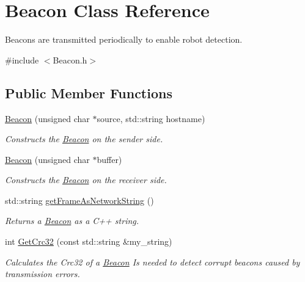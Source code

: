 \hypertarget{classBeacon}{\section{Beacon Class Reference}
\label{classBeacon}
}


Beacons are transmitted periodically to enable robot detection.  




{\ttfamily \#include $<$Beacon.\-h$>$}

\subsection*{Public Member Functions}
\begin{DoxyCompactItemize}
\item 
\hyperlink{classBeacon_aaffc4541f12325619271033678112f9f}{Beacon} (unsigned char $\ast$source, std\-::string hostname)
\begin{DoxyCompactList}\small\item\em Constructs the \hyperlink{classBeacon}{Beacon} on the sender side. \end{DoxyCompactList}\item 
\hyperlink{classBeacon_a2c2bd4621a255efdf2f60076b00cd683}{Beacon} (unsigned char $\ast$buffer)
\begin{DoxyCompactList}\small\item\em Constructs the \hyperlink{classBeacon}{Beacon} on the receiver side. \end{DoxyCompactList}\item 
std\-::string \hyperlink{classBeacon_acc9536d578591492b2a09064667d09d2}{get\-Frame\-As\-Network\-String} ()
\begin{DoxyCompactList}\small\item\em Returns a \hyperlink{classBeacon}{Beacon} as a C++ string. \end{DoxyCompactList}\item 
int \hyperlink{classBeacon_a85a0dbb4be299c38792b5b6c12f40e8b}{Get\-Crc32} (const std\-::string \&my\-\_\-string)
\begin{DoxyCompactList}\small\item\em Calculates the Crc32 of a \hyperlink{classBeacon}{Beacon} Is needed to detect corrupt beacons caused by transmission errors. \end{DoxyCompactList}\end{DoxyCompactItemize}
